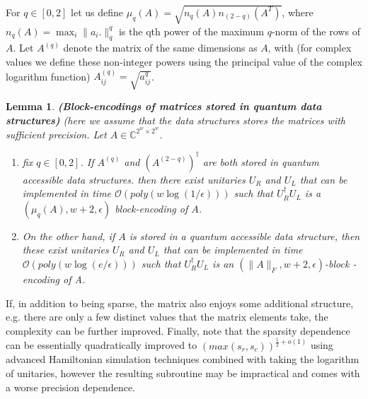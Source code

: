 \documentclass[12pt, oneside]{book}
\newtheorem{lemma}[theorem]{Lemma}
\theoremstyle{definition}
\theoremstyle{definition}
\theoremstyle{remark}
\begin{document}
For $q\in[0,2]$ let us define $\mu_q(A)=\sqrt{n_q(A)n_{(2-q)}(A^T)}$, where $n_q(A)=\max_i\|a_i.\|_q^q$ is the qth power of the maximum $q$-norm of the rows of $A$. Let $A^{(q)}$ denote the matrix of the same dimensions as $A$, with (for complex values we define these non-integer powers using the principal value of the complex logarithm function) $A_{ij}^{(q)}=\sqrt{a_{ij}^q}$. 
\begin{lemma}
    \textbf{(Block-encodings of matrices stored in quantum data structures)} (here we assume that the data structures stores the matrices with sufficient precision. Let $A\in\mathbb{C}^{2^w\times 2^w}$.
    \begin{enumerate}
        \item fix $q\in[0,2]$. If $A^{(q)}$ and $(A^{(2-q)})^{\dagger}$ are both stored in quantum accessible data structures. then there exist unitaries $U_R$ and $U_L$ that can be implemented in time $\mathcal{O}(poly(w\log(1/\epsilon)))$ such that $U_R^{\dagger}U_L$ is a $(\mu_q(A),w+2,\epsilon)$ block-encoding of $A$.
        \item On the other hand, if $A$ is stored in a quantum accessible data structure, then these exist unitaries $U_R$ and $U_L$ that can be implemented in time $\mathcal{O}(poly(w\log(e/\epsilon)))$ such that $U_R^{\dagger}U_L$ is an $(\|A\|_F,w+2,\epsilon)$-block -encoding of A.
    \end{enumerate}
\end{lemma}











If, in addition to being sparse, the matrix also enjoys some additional structure, e.g. there are only a few distinct values that the matrix elements take, the complexity can be further improved. Finally, note that the sparsity dependence can be essentially quadratically improved to $(max(s_r,s_c))^{\frac{1}{2}+o(1)}$ using advanced Hamiltonian simulation techniques combined with taking the logarithm of unitaries, however the resulting subroutine may be impractical and comes with a worse precision dependence.
\end{document}
